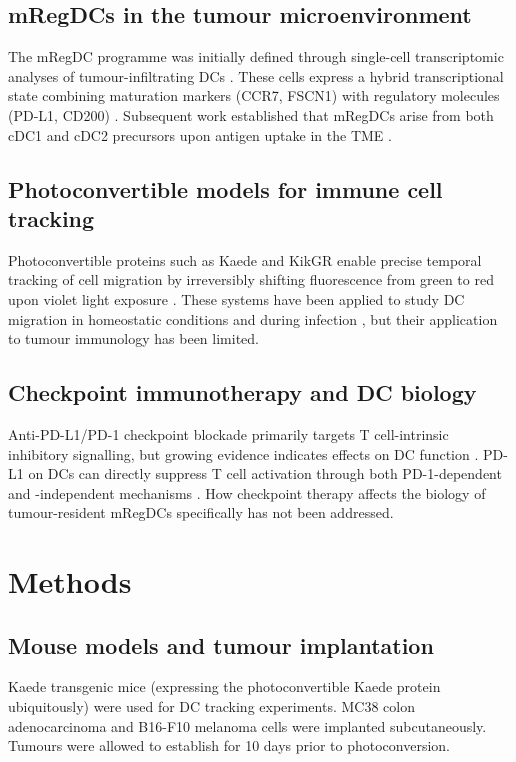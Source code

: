 \documentclass[11pt]{article}
\begin{document}
\subsection{mRegDCs in the tumour microenvironment}
The mRegDC programme was initially defined through single-cell transcriptomic analyses of tumour-infiltrating DCs \citep{maier2020}. These cells express a hybrid transcriptional state combining maturation markers (CCR7, FSCN1) with regulatory molecules (PD-L1, CD200) \citep{gerhard2021,cheng2021}. Subsequent work established that mRegDCs arise from both cDC1 and cDC2 precursors upon antigen uptake in the TME \citep{binnewies2019,bosteels2020}.

\subsection{Photoconvertible models for immune cell tracking}
Photoconvertible proteins such as Kaede and KikGR enable precise temporal tracking of cell migration by irreversibly shifting fluorescence from green to red upon violet light exposure \citep{tomura2008,nowotschin2009}. These systems have been applied to study DC migration in homeostatic conditions \citep{kitano2016} and during infection \citep{gerner2012}, but their application to tumour immunology has been limited.

\subsection{Checkpoint immunotherapy and DC biology}
Anti-PD-L1/PD-1 checkpoint blockade primarily targets T cell-intrinsic inhibitory signalling, but growing evidence indicates effects on DC function \citep{garris2018,oh2020}. PD-L1 on DCs can directly suppress T cell activation through both PD-1-dependent and -independent mechanisms \citep{lin2020,peng2020}. How checkpoint therapy affects the biology of tumour-resident mRegDCs specifically has not been addressed.

\section{Methods}

\subsection{Mouse models and tumour implantation}
Kaede transgenic mice (expressing the photoconvertible Kaede protein ubiquitously) were used for DC tracking experiments. MC38 colon adenocarcinoma and B16-F10 melanoma cells were implanted subcutaneously. Tumours were allowed to establish for 10 days prior to photoconversion.
\end{document}
